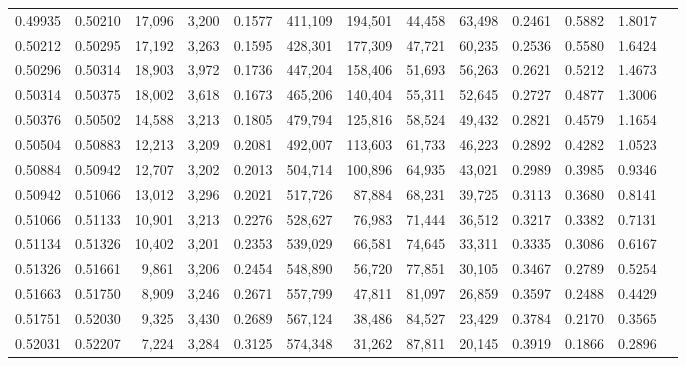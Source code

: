 \begin{tabular}{rrrrrrrrrrrrr}
0.49935 & 0.50210 & 17,096 & 3,200 &                                     0.1577 & 411,109 & 194,501 &  44,458 &  63,498 & 0.2461 & 0.5882 & 1.8017 \\
0.50212 & 0.50295 & 17,192 & 3,263 &                                     0.1595 & 428,301 & 177,309 &  47,721 &  60,235 & 0.2536 & 0.5580 & 1.6424 \\
0.50296 & 0.50314 & 18,903 & 3,972 &                                     0.1736 & 447,204 & 158,406 &  51,693 &  56,263 & 0.2621 & 0.5212 & 1.4673 \\
0.50314 & 0.50375 & 18,002 & 3,618 &                                     0.1673 & 465,206 & 140,404 &  55,311 &  52,645 & 0.2727 & 0.4877 & 1.3006 \\
0.50376 & 0.50502 & 14,588 & 3,213 &                                     0.1805 & 479,794 & 125,816 &  58,524 &  49,432 & 0.2821 & 0.4579 & 1.1654 \\
0.50504 & 0.50883 & 12,213 & 3,209 &                                     0.2081 & 492,007 & 113,603 &  61,733 &  46,223 & 0.2892 & 0.4282 & 1.0523 \\
0.50884 & 0.50942 & 12,707 & 3,202 &                                     0.2013 & 504,714 & 100,896 &  64,935 &  43,021 & 0.2989 & 0.3985 & 0.9346 \\
0.50942 & 0.51066 & 13,012 & 3,296 &                                     0.2021 & 517,726 &  87,884 &  68,231 &  39,725 & 0.3113 & 0.3680 & 0.8141 \\
0.51066 & 0.51133 & 10,901 & 3,213 &                                     0.2276 & 528,627 &  76,983 &  71,444 &  36,512 & 0.3217 & 0.3382 & 0.7131 \\
0.51134 & 0.51326 & 10,402 & 3,201 &                                     0.2353 & 539,029 &  66,581 &  74,645 &  33,311 & 0.3335 & 0.3086 & 0.6167 \\
0.51326 & 0.51661 &  9,861 & 3,206 &                                     0.2454 & 548,890 &  56,720 &  77,851 &  30,105 & 0.3467 & 0.2789 & 0.5254 \\
0.51663 & 0.51750 &  8,909 & 3,246 &                                     0.2671 & 557,799 &  47,811 &  81,097 &  26,859 & 0.3597 & 0.2488 & 0.4429 \\
0.51751 & 0.52030 &  9,325 & 3,430 &                                     0.2689 & 567,124 &  38,486 &  84,527 &  23,429 & 0.3784 & 0.2170 & 0.3565 \\
0.52031 & 0.52207 &  7,224 & 3,284 &                                     0.3125 & 574,348 &  31,262 &  87,811 &  20,145 & 0.3919 & 0.1866 & 0.2896 \\

\end{tabular}
